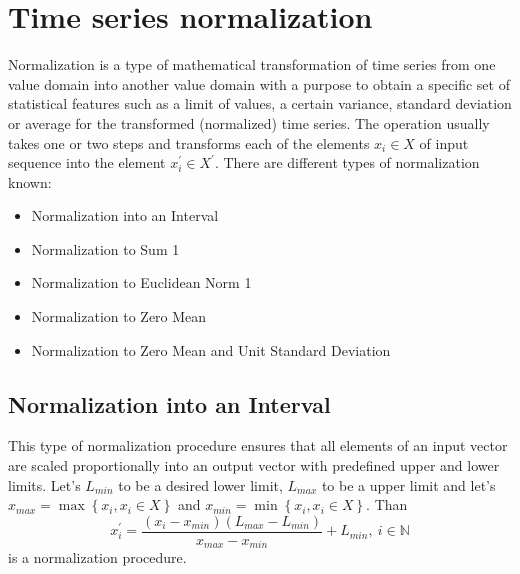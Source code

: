 \section{Time series normalization}

Normalization is a type of mathematical transformation of time series from one value domain into another value domain with a purpose to obtain a specific set of statistical features such as a limit of values, a certain variance, standard deviation or average for the transformed (normalized) time series. The operation usually takes one or two steps and transforms each of the elements $x_{i} \in X$ of input sequence into the element $x_{i}^{'} \in X^{'}$. There are different types of normalization known:
\begin{itemize}
	\item Normalization into an Interval \cite{citeulike:4295248} \cite{citeulike:2753031}
  \item Normalization to Sum 1
  \item Normalization to Euclidean Norm 1
  \item Normalization to Zero Mean
  \item Normalization to Zero Mean and Unit Standard Deviation \cite{citeulike:3815880}
\end{itemize}

\subsection{Normalization into an Interval}
This type of normalization procedure ensures that all elements of an input vector are scaled proportionally into an output vector with predefined upper and lower limits.
Let's $L_{min}$ to be a desired lower limit, $L_{max}$ to be a upper limit and let's $x_{max} = \max \left\{ x_{i}, x_{i} \in X \right\}$ and $x_{min} = \min \left\{ x_{i}, x_{i} \in X \right\}$. Than
\begin{equation}
x_{i}^{'} = \frac{ (x_{i}-x_{min}) (L_{max} - L_{min}) }{ x_{max} - x_{min} } + L_{min	}, \: i \in \mathbb{N}
\end{equation}
is a normalization procedure.

